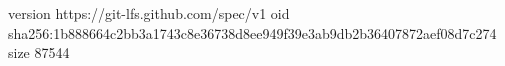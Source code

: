 version https://git-lfs.github.com/spec/v1
oid sha256:1b888664c2bb3a1743c8e36738d8ee949f39e3ab9db2b36407872aef08d7c274
size 87544

